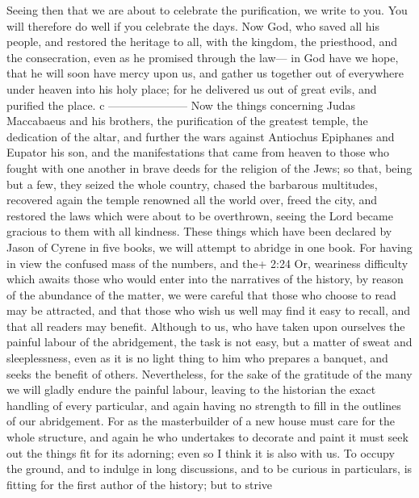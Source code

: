  Seeing then that we are about to celebrate the
purification, we write to you. You will therefore do well if you
celebrate the days.  Now God, who saved all his people, and
restored the heritage to all, with the kingdom, the priesthood, and the
consecration,  even as he promised through the law--- in
God have we hope, that he will soon have mercy upon us, and gather us
together out of everywhere under heaven into his holy place; for he
delivered us out of great evils, and purified the place. c
---------------------  Now the things concerning Judas
Maccabaeus and his brothers, the purification of the greatest temple,
the dedication of the altar,  and further the wars against
Antiochus Epiphanes and Eupator his son,  and the
manifestations that came from heaven to those who fought with one
another in brave deeds for the religion of the Jews; so that, being but
a few, they seized the whole country, chased the barbarous multitudes,
 recovered again the temple renowned all the world over,
freed the city, and restored the laws which were about to be overthrown,
seeing the Lord became gracious to them with all kindness. 
These things which have been declared by Jason of Cyrene in five books,
we will attempt to abridge in one book.  For having in view
the confused mass of the numbers, and the+ 2:24 Or, weariness difficulty
which awaits those who would enter into the narratives of the history,
by reason of the abundance of the matter,  we were careful
that those who choose to read may be attracted, and that those who wish
us well may find it easy to recall, and that all readers may benefit.
 Although to us, who have taken upon ourselves the painful
labour of the abridgement, the task is not easy, but a matter of sweat
and sleeplessness,  even as it is no light thing to him who
prepares a banquet, and seeks the benefit of others. Nevertheless, for
the sake of the gratitude of the many we will gladly endure the painful
labour,  leaving to the historian the exact handling of
every particular, and again having no strength to fill in the outlines
of our abridgement.  For as the masterbuilder of a new
house must care for the whole structure, and again he who undertakes to
decorate and paint it must seek out the things fit for its adorning;
even so I think it is also with us.  To occupy the ground,
and to indulge in long discussions, and to be curious in particulars, is
fitting for the first author of the history;  but to strive
